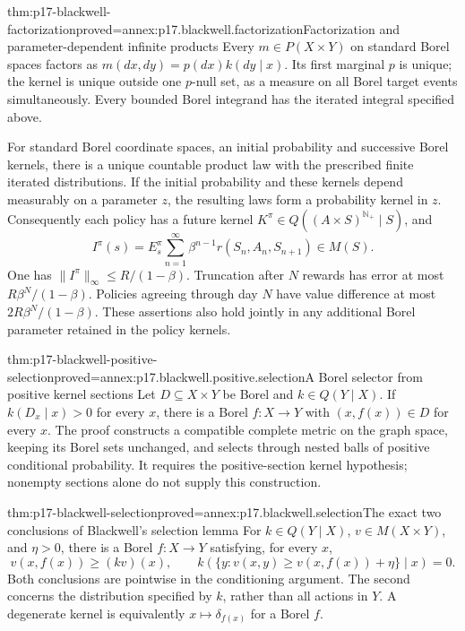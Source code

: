 \begin{hbtheorem}{thm:p17-blackwell-factorization}{proved=annex:p17.blackwell.factorization}{Factorization and parameter-dependent infinite products}
Every \(m\in P(X\times Y)\) on standard Borel spaces factors as
\(m(dx,dy)=p(dx)k(dy\mid x)\). Its first marginal \(p\) is unique;
the kernel is unique outside one \(p\)-null set, as a measure on
all Borel target events simultaneously.
Every bounded Borel integrand has the iterated integral specified above.

For standard Borel coordinate spaces, an initial probability and
successive Borel kernels, there is a unique countable product law
with the prescribed finite iterated distributions. If the initial
probability and these kernels depend measurably on a parameter \(z\),
the resulting laws form a probability kernel in \(z\).
Consequently each policy has a future kernel
\(K^\pi\in Q((A\times S)^{\mathbb N_+}\mid S)\), and
\[
 I^\pi(s)=E_s^\pi\sum_{n=1}^{\infty}
       \beta^{n-1}r(S_n,A_n,S_{n+1})\in M(S).
\]
One has \(\|I^\pi\|_\infty\leq R/(1-\beta)\).
Truncation after \(N\) rewards has error at most
\(R\beta^N/(1-\beta)\). Policies agreeing through day \(N\)
have value difference at most \(2R\beta^N/(1-\beta)\).
These assertions also hold jointly in any additional Borel
parameter retained in the policy kernels.
\end{hbtheorem}

\begin{hblemma}{thm:p17-blackwell-positive-selection}{proved=annex:p17.blackwell.positive.selection}{A Borel selector from positive kernel sections}
Let \(D\subseteq X\times Y\) be Borel and
\(k\in Q(Y\mid X)\). If \(k(D_x\mid x)>0\) for every \(x\),
there is a Borel \(f:X\to Y\) with \((x,f(x))\in D\) for
every \(x\). The proof constructs a compatible complete metric
on the graph space, keeping its Borel sets unchanged, and selects
through nested balls of positive conditional probability.
It requires the positive-section kernel hypothesis; nonempty
sections alone do not supply this construction.
\end{hblemma}

\begin{hblemma}{thm:p17-blackwell-selection}{proved=annex:p17.blackwell.selection}{The exact two conclusions of Blackwell's selection lemma}
For \(k\in Q(Y\mid X)\), \(v\in M(X\times Y)\), and
\(\eta>0\), there is a Borel \(f:X\to Y\) satisfying, for every \(x\),
\[
 v(x,f(x))\geq(kv)(x),\qquad
 k(\{y:v(x,y)\geq v(x,f(x))+\eta\}\mid x)=0.
\]
Both conclusions are pointwise in the conditioning argument.
The second concerns the distribution specified by \(k\), rather than
all actions in \(Y\). A degenerate kernel is equivalently
\(x\mapsto\delta_{f(x)}\) for a Borel \(f\).
\end{hblemma}

